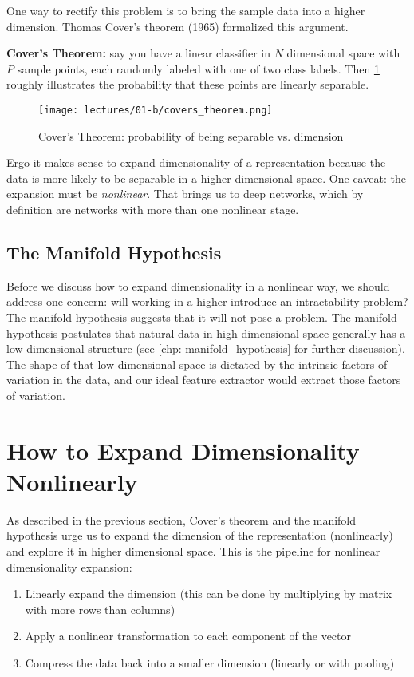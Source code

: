 One way to rectify this problem is to bring the sample data into a higher dimension.
Thomas Cover's theorem (1965) formalized this argument.

\textbf{Cover's Theorem:} say you have a linear classifier in $N$ dimensional space with $P$ sample points, each randomly labeled with one of two class labels.
Then \cref{fig:covers_theorem} roughly illustrates the probability that these points are linearly separable.

\begin{figure}[ht]
\centering
\texttt{[image: lectures/01-b/covers\_theorem.png]}
\caption{Cover's Theorem: probability of being separable vs. dimension}
\label{fig:covers_theorem}
\end{figure}

Ergo it makes sense to expand dimensionality of a representation because the data is more likely to be separable in a higher dimensional space.
One caveat: the expansion must be \emph{nonlinear}.
That brings us to deep networks, which by definition are networks with more than one nonlinear stage.

\subsection{The Manifold Hypothesis}

Before we discuss how to expand dimensionality in a nonlinear way, we should address one concern: will working in a higher introduce an intractability problem?
The manifold hypothesis suggests that it will not pose a problem.
The manifold hypothesis postulates that natural data in high-dimensional space generally has a low-dimensional structure (see \cref{chp: manifold_hypothesis} for further discussion).
The shape of that low-dimensional space is dictated by the intrinsic factors of variation in the data, and our ideal feature extractor would extract those factors of variation.

\section{How to Expand Dimensionality Nonlinearly}\label{sec: expand_dim}

As described in the previous section, Cover's theorem and the manifold hypothesis urge us to expand the dimension of the representation (nonlinearly) and explore it in higher dimensional space.
This is the pipeline for nonlinear dimensionality expansion:
\begin{enumerate}
    \item Linearly expand the dimension (this can be done by multiplying by matrix with more rows than columns)
    \item Apply a nonlinear transformation to each component of the vector
    \item Compress the data back into a smaller dimension (linearly or with pooling)
\end{enumerate}

